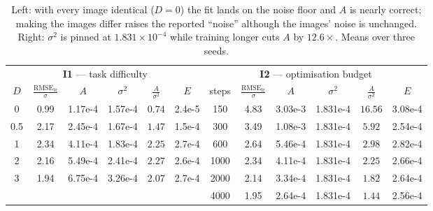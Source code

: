 \documentclass[10pt]{article}
\begin{document}
\begin{table}[h]
\centering
\small
\begin{tabular}{cccccc@{\hskip 2em}cccccc}
\toprule
\multicolumn{6}{c}{\textbf{I1} --- task difficulty} & \multicolumn{6}{c}{\textbf{I2} --- optimisation budget} \\
\cmidrule(r){1-6}\cmidrule(l){7-12}
$D$ & $\frac{\mathrm{RMSE}_{\mathrm{tr}}}{\sigma}$ & $A$ & $\sigma^2$ & $\frac{A}{\sigma^2}$ & $E$ &
steps & $\frac{\mathrm{RMSE}_{\mathrm{tr}}}{\sigma}$ & $A$ & $\sigma^2$ & $\frac{A}{\sigma^2}$ & $E$ \\
\midrule
0   & 0.99 & 1.17e-4 & 1.57e-4 & $\mathbf{0.74}$ & 2.4e-5 &  150 & 4.83 & 3.03e-3 & 1.831e-4 & $\mathbf{16.56}$ & 3.08e-4 \\
0.5 & 2.17 & 2.45e-4 & 1.67e-4 & $\mathbf{1.47}$ & 1.5e-4 &  300 & 3.49 & 1.08e-3 & 1.831e-4 & $\mathbf{5.92}$  & 2.54e-4 \\
1   & 2.34 & 4.11e-4 & 1.83e-4 & $\mathbf{2.25}$ & 2.7e-4 &  600 & 2.64 & 5.46e-4 & 1.831e-4 & $\mathbf{2.98}$  & 2.82e-4 \\
2   & 2.16 & 5.49e-4 & 2.41e-4 & $\mathbf{2.27}$ & 2.6e-4 & 1000 & 2.34 & 4.11e-4 & 1.831e-4 & $\mathbf{2.25}$  & 2.66e-4 \\
3   & 1.94 & 6.75e-4 & 3.26e-4 & $\mathbf{2.07}$ & 2.7e-4 & 2000 & 2.14 & 3.34e-4 & 1.831e-4 & $\mathbf{1.82}$  & 2.64e-4 \\
    &      &         &         &                 &        & 4000 & 1.95 & 2.64e-4 & 1.831e-4 & $\mathbf{1.44}$  & 2.56e-4 \\
\bottomrule
\end{tabular}
\caption{Left: with every image identical ($D=0$) the fit lands on the noise floor and $A$ is
nearly correct; making the images differ raises the reported ``noise'' although the images'
noise is unchanged. Right: $\sigma^2$ is pinned at $1.831\times10^{-4}$ while training longer
cuts $A$ by $12.6\times$. Means over three seeds.}
\label{tab:interventions}
\end{table}
\end{document}
